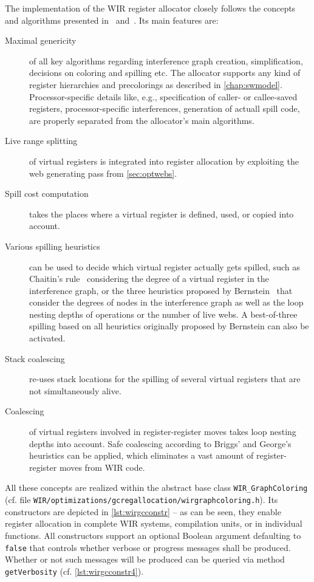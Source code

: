 The implementation of the \gls{WIR} register allocator closely follows the concepts and algorithms presented in~\cite[chapter~16.3]{Much97} and~\cite[chapter~11]{Appel04}.
Its main features are:
\begin{description}
  \item[Maximal genericity] of all key algorithms regarding interference graph creation, simplification, decisions on coloring and spilling etc.
  The allocator supports any kind of register hierarchies and precolorings as described in \cref{chap:swmodel}.
  Processor-specific details like, e.g., specification of caller- or callee-saved registers, processor-specific interferences, generation of actuall spill code, are properly separated from the allocator's main algorithms.
  \item[Live range splitting] of virtual registers is integrated into register allocation by exploiting the web generating pass from \cref{sec:optwebs}.
  \item[Spill cost computation] takes the places where a virtual register is defined, used, or copied into account.
  \item[Various spilling heuristics] can be used to decide which virtual register actually gets spilled, such as Chaitin's rule~\cite[Eq.~(2.1)]{Brig92} considering the degree of a virtual register in the interference graph, or the three heuristics proposed by Bernstein~\cite{BGM+89} that consider the degrees of nodes in the interference graph as well as the loop nesting depths of operations or the number of live webs.
  A best-of-three spilling based on all heuristics originally proposed by Bernstein can also be activated.
  \item[Stack coalescing] re-uses stack locations for the spilling of several virtual registers that are not simultaneously alive.
  \item[Coalescing] of virtual registers involved in register-register moves takes loop nesting depths into account.
  Safe coalescing according to Briggs' and George's heuristics can be applied, which eliminates a vast amount of register-register moves from \gls{WIR} code.
\end{description}
All these concepts are realized within the abstract base class \texttt{WIR\_GraphColoring} (cf. file \texttt{WIR/optimiza\-tions/gcregallocation/wirgraphcoloring.h}).
Its constructors are depicted in \cref{lst:wirgcconstr} -- as can be seen, they enable register allocation in complete \gls{WIR} systems, compilation units, or in individual functions.
All constructors support an optional Boolean argument defaulting to \texttt{false} that controls whether verbose or progress messages shall be produced.
Whether or not such messages will be produced can be queried via method \texttt{getVerbosity} (cf. \cref{lst:wirgcconstr4}).


